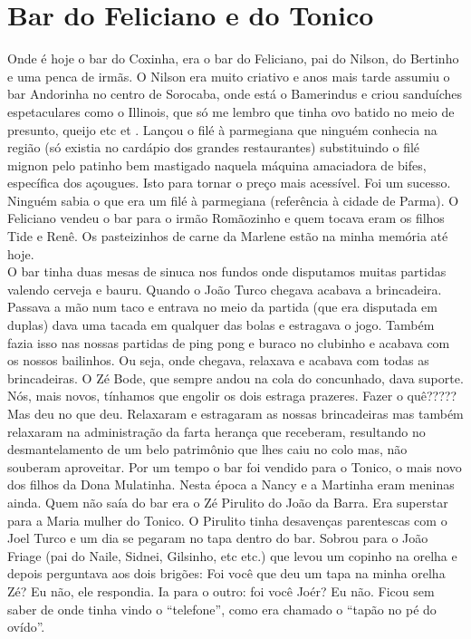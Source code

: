 \documentclass[12pt,brazil,]{book}
\begin{document}
\section{Bar do Feliciano e do
Tonico}\label{bar-do-feliciano-e-do-tonico}

Onde é hoje o bar do Coxinha, era o bar do Feliciano, pai do Nilson, do
Bertinho e uma penca de irmãs. O Nilson era muito criativo e anos mais
tarde assumiu o bar Andorinha no centro de Sorocaba, onde está o
Bamerindus e criou sanduíches espetaculares como o Illinois, que só me
lembro que tinha ovo batido no meio de presunto, queijo etc et . Lançou
o filé à parmegiana que ninguém conhecia na região (só existia no
cardápio dos grandes restaurantes) substituindo o filé mignon pelo
patinho bem mastigado naquela máquina amaciadora de bifes, específica
dos açougues. Isto para tornar o preço mais acessível. Foi um sucesso.
Ninguém sabia o que era um filé à parmegiana (referência à cidade de
Parma). O Feliciano vendeu o bar para o irmão Romãozinho e quem tocava
eram os filhos Tide e Renê. Os pasteizinhos de carne da Marlene estão na
minha memória até hoje.\\
O bar tinha duas mesas de sinuca nos fundos onde disputamos muitas
partidas valendo cerveja e bauru. Quando o João Turco chegava acabava a
brincadeira. Passava a mão num taco e entrava no meio da partida (que
era disputada em duplas) dava uma tacada em qualquer das bolas e
estragava o jogo. Também fazia isso nas nossas partidas de ping pong e
buraco no clubinho e acabava com os nossos bailinhos. Ou seja, onde
chegava, relaxava e acabava com todas as brincadeiras. O Zé Bode, que
sempre andou na cola do concunhado, dava suporte. Nós, mais novos,
tínhamos que engolir os dois estraga prazeres. Fazer o quê????? Mas deu
no que deu. Relaxaram e estragaram as nossas brincadeiras mas também
relaxaram na administração da farta herança que receberam, resultando no
desmantelamento de um belo patrimônio que lhes caiu no colo mas, não
souberam aproveitar. Por um tempo o bar foi vendido para o Tonico, o
mais novo dos filhos da Dona Mulatinha. Nesta época a Nancy e a Martinha
eram meninas ainda. Quem não saía do bar era o Zé Pirulito do João da
Barra. Era superstar para a Maria mulher do Tonico. O Pirulito tinha
desavenças parentescas com o Joel Turco e um dia se pegaram no tapa
dentro do bar. Sobrou para o João Friage (pai do Naile, Sidnei,
Gilsinho, etc etc.) que levou um copinho na orelha e depois perguntava
aos dois brigões: Foi você que deu um tapa na minha orelha Zé? Eu não,
ele respondia. Ia para o outro: foi você Joér? Eu não. Ficou sem saber
de onde tinha vindo o ``telefone'', como era chamado o ``tapão no pé do
ovído''.
\end{document}
